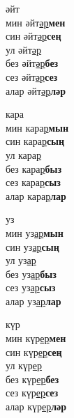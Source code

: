 \begin{multicols}{4}
\begin{enumerate}
\begin{minipage}{\linewidth}
    \item
    әйт\\
    мин әйт\underline{әр}\textbf{мен}\\
    син әйт\underline{әр}\textbf{сең}\\
    ул әйт\underline{әр}\\
    без әйт\underline{әр}\textbf{без}\\
    сез әйт\underline{әр}\textbf{сез}\\
    алар әйт\underline{әр}\textbf{ләр}\\
\end{minipage}

\begin{minipage}{\linewidth}
    \item
    кара\\
    мин кара\underline{р}\textbf{мын}\\
    син кара\underline{р}\textbf{сың}\\
    ул кара\underline{р}\\
    без кара\underline{р}\textbf{быз}\\
    сез кара\underline{р}\textbf{сыз}\\
    алар кара\underline{р}\textbf{лар}\\
\end{minipage}

\begin{minipage}{\linewidth}
    \item
    уз\\
    мин уз\underline{ар}\textbf{мын}\\
    син уз\underline{ар}\textbf{сың}\\
    ул уз\underline{ар}\\
    без уз\underline{ар}\textbf{быз}\\
    сез уз\underline{ар}\textbf{сыз}\\
    алар уз\underline{ар}\textbf{лар}\\
\end{minipage}

\begin{minipage}{\linewidth}
    \item
    күр\\
    мин күр\underline{ер}\textbf{мен}\\
    син күр\underline{ер}\textbf{сең}\\
    ул күр\underline{ер}\\
    без күр\underline{ер}\textbf{без}\\
    сез күр\underline{ер}\textbf{сез}\\
    алар күр\underline{ер}\textbf{ләр}\\
\end{minipage}


\end{enumerate}
\end{multicols}

